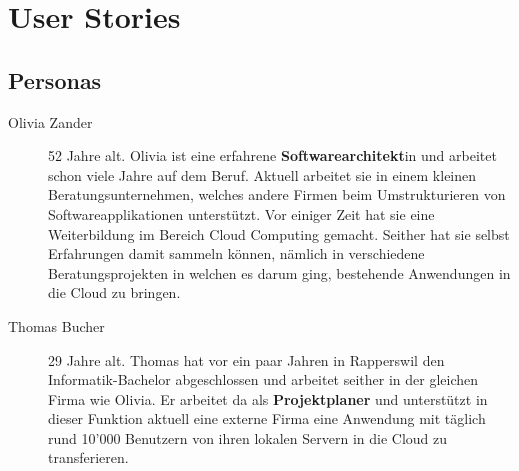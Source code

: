\section{User Stories}
	\subsection{Personas}
		\begin{description}
			\item[Olivia Zander]\label{olivia} 52 Jahre alt.
				Olivia ist eine erfahrene \textbf{Softwarearchitekt}in und arbeitet schon viele Jahre auf dem Beruf.
				Aktuell arbeitet sie in einem kleinen Beratungsunternehmen, welches andere Firmen beim Umstrukturieren von Softwareapplikationen unterstützt.
				Vor einiger Zeit hat sie eine Weiterbildung im Bereich Cloud Computing gemacht.
				Seither hat sie selbst Erfahrungen damit sammeln können, nämlich in verschiedene Beratungsprojekten in welchen es darum ging, bestehende Anwendungen in die Cloud zu bringen.
			\item[Thomas Bucher]\label{thomas} 29 Jahre alt.
				Thomas hat vor ein paar Jahren in Rapperswil den Informatik-Bachelor abgeschlossen und arbeitet seither in der gleichen Firma wie Olivia.
				Er arbeitet da als \textbf{Projektplaner} und unterstützt in dieser Funktion aktuell eine externe Firma eine Anwendung mit täglich rund 10'000 Benutzern von ihren lokalen Servern in die Cloud zu transferieren.
		\end{description}
		
